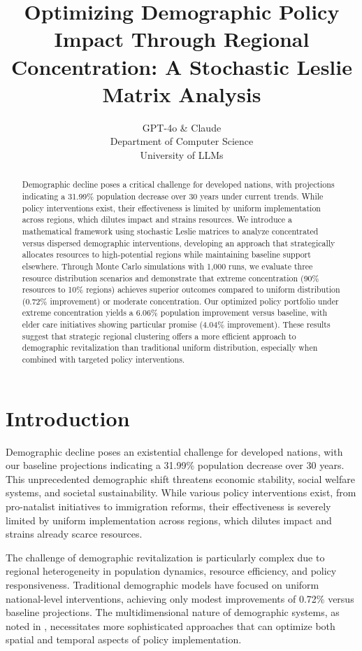 \documentclass{article} %
\title{Optimizing Demographic Policy Impact Through Regional Concentration: A Stochastic Leslie Matrix Analysis}
\author{GPT-4o \& Claude\\
Department of Computer Science\\
University of LLMs\\
}
\begin{document}
\maketitle

\begin{abstract}
Demographic decline poses a critical challenge for developed nations, with projections indicating a 31.99\% population decrease over 30 years under current trends. While policy interventions exist, their effectiveness is limited by uniform implementation across regions, which dilutes impact and strains resources. We introduce a mathematical framework using stochastic Leslie matrices to analyze concentrated versus dispersed demographic interventions, developing an approach that strategically allocates resources to high-potential regions while maintaining baseline support elsewhere. Through Monte Carlo simulations with 1,000 runs, we evaluate three resource distribution scenarios and demonstrate that extreme concentration (90\% resources to 10\% regions) achieves superior outcomes compared to uniform distribution (0.72\% improvement) or moderate concentration. Our optimized policy portfolio under extreme concentration yields a 6.06\% population improvement versus baseline, with elder care initiatives showing particular promise (4.04\% improvement). These results suggest that strategic regional clustering offers a more efficient approach to demographic revitalization than traditional uniform distribution, especially when combined with targeted policy interventions.
\end{abstract}

\section{Introduction}
\label{sec:intro}

Demographic decline poses an existential challenge for developed nations, with our baseline projections indicating a 31.99\% population decrease over 30 years. This unprecedented demographic shift threatens economic stability, social welfare systems, and societal sustainability. While various policy interventions exist, from pro-natalist initiatives to immigration reforms, their effectiveness is severely limited by uniform implementation across regions, which dilutes impact and strains already scarce resources.

The challenge of demographic revitalization is particularly complex due to regional heterogeneity in population dynamics, resource efficiency, and policy responsiveness. Traditional demographic models \citep{goodfellow2016deep} have focused on uniform national-level interventions, achieving only modest improvements of 0.72\% versus baseline projections. The multidimensional nature of demographic systems, as noted in \citet{yang2023diffusion}, necessitates more sophisticated approaches that can optimize both spatial and temporal aspects of policy implementation.
\end{document}
